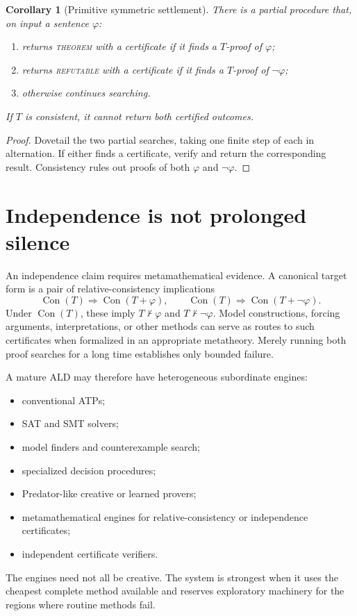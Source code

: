 \documentclass[11pt,oneside]{book}
\newtheorem{corollary}[theorem]{Corollary}
\theoremstyle{definition}
\theoremstyle{remark}
\newcommand{\Con}{\operatorname{Con}}
\begin{document}
\begin{corollary}[Primitive symmetric settlement]\label{cor:settlement}
There is a partial procedure that, on input a sentence $\varphi$:
\begin{enumerate}[label=(\alph*)]
\item returns \textsc{theorem} with a certificate if it finds a $T$-proof of $\varphi$;
\item returns \textsc{refutable} with a certificate if it finds a $T$-proof of $\neg\varphi$;
\item otherwise continues searching.
\end{enumerate}
If $T$ is consistent, it cannot return both certified outcomes.
\end{corollary}
\begin{proof}
Dovetail the two partial searches, taking one finite step of each in alternation. If either finds a certificate, verify and return the corresponding result. Consistency rules out proofs of both $\varphi$ and $\neg\varphi$.
\end{proof}

\section{Independence is not prolonged silence}
An independence claim requires metamathematical evidence. A canonical target form is a pair of relative-consistency implications
\[
\Con(T)\Rightarrow\Con(T+\varphi),
\qquad
\Con(T)\Rightarrow\Con(T+\neg\varphi).
\]
Under $\Con(T)$, these imply $T\nvdash\varphi$ and $T\nvdash\neg\varphi$. Model constructions, forcing arguments, interpretations, or other methods can serve as routes to such certificates when formalized in an appropriate metatheory. Merely running both proof searches for a long time establishes only bounded failure.

A mature ALD may therefore have heterogeneous subordinate engines:
\begin{itemize}
\item conventional ATPs;
\item SAT and SMT solvers;
\item model finders and counterexample search;
\item specialized decision procedures;
\item Predator-like creative or learned provers;
\item metamathematical engines for relative-consistency or independence certificates;
\item independent certificate verifiers.
\end{itemize}
The engines need not all be creative. The system is strongest when it uses the cheapest complete method available and reserves exploratory machinery for the regions where routine methods fail.
\end{document}
